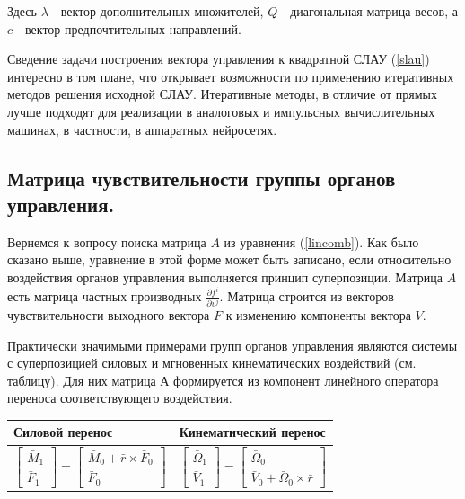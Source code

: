 \documentclass[a4paper]{article}
\begin{document}
Здесь $\lambda$ - вектор дополнительных множителей, $Q$ - диагональная матрица весов, а $c$ - вектор предпочтительных направлений. 

Сведение задачи построения вектора управления к квадратной СЛАУ (\ref{slau}) интересно в том плане, что открывает возможности по применению итеративных методов решения исходной СЛАУ. Итеративные методы, в отличие от прямых лучше подходят для реализации в аналоговых и импульсных вычислительных машинах, в частности, в аппаратных нейросетях.

\subsection{Матрица чувствительности группы органов управления.}
Вернемся к вопросу поиска матрица $A$ из уравнения (\ref{lincomb}). Как было сказано выше, уравнение в этой форме может быть записано, если относительно воздействия органов управления выполняется принцип суперпозиции. Матрица $A$ есть матрица частных производных $\frac{\partial{f^i}}{\partial{v^j}}$. Матрица строится из векторов чувствительности выходного вектора $F$ к изменению компоненты вектора $V$.

Практически значимыми примерами групп органов управления являются системы с суперпозицией силовых и мгновенных кинематических воздействий (см. таблицу). Для них матрица $А$ формируется из компонент линейного оператора переноса соответствующего воздействия.

\begin{table}[ht]
	\centering
	\begin{tabular}{| p{7cm} | p{7cm} |}
		\hline
		Силовой перенос & Кинематический перенос \\
		\hline
		\begin{equation} \label{eq:ftrans}
		\begin{bmatrix} \bar{M}_1 \\ \bar{F}_1 \end{bmatrix} 
			= \begin{bmatrix} \bar{M}_0 + \bar{r} \times \bar{F}_0 \\ \bar{F}_0 \end{bmatrix}
		\end{equation}
		&
		\begin{equation} \label{eq:ctrans}
		\begin{bmatrix} \bar{\Omega}_1 \\ \bar{V}_1 \end{bmatrix} 
			= \begin{bmatrix} \bar{\Omega}_0 \\ \bar{V}_0 + \bar{\Omega}_0 \times \bar{r} \end{bmatrix}
		\end{equation}\\
		
		\hline
	\end{tabular}
\end{table}
\end{document}
